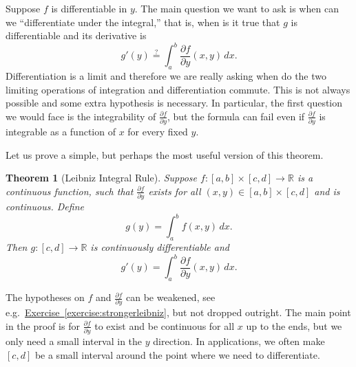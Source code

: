 \documentclass[12pt,openany]{book}
\newcommand{\R}{{\mathbb{R}}}
\newcommand{\myindex}[1]{#1\index{#1}}
\theoremstyle{plain}
\newtheorem{thm}{Theorem}[section]
\theoremstyle{remark}
\theoremstyle{definition}
\theoremstyle{exercise}
\theoremstyle{example}
\newcommand{\exerciseref}[1]{\hyperref[#1]{Exercise~\ref*{#1}}}
\begin{document}
Suppose $f$ is differentiable in $y$.  The main question we want to
ask is when can we ``differentiate under the integral,'' that is,
when is it true that $g$ is differentiable and its derivative is
\begin{equation*}
g'(y) \overset{?}{=} \int_a^b \frac{\partial f}{\partial y}(x,y) \,dx .
\end{equation*}
Differentiation is a limit and therefore we are really asking when do the
two limiting operations of integration and differentiation commute.
This is not always possible and some extra hypothesis is
necessary.  In particular, the first
question we would face is the integrability of
$\frac{\partial f}{\partial y}$, but the formula can fail even if
$\frac{\partial f}{\partial y}$ is integrable as a function of $x$ for every
fixed $y$.

Let us prove a simple, but perhaps the most useful version of this theorem.

\begin{thm}[\myindex{Leibniz Integral Rule}]
Suppose $f \colon [a,b] \times [c,d] \to \R$ is a continuous function,
such that $\frac{\partial f}{\partial y}$ exists for all $(x,y) \in [a,b]
\times [c,d]$ and is continuous.  Define
\begin{equation*}
g(y) = \int_a^b f(x,y) \,dx .
\end{equation*}
Then $g \colon [c,d] \to \R$ is continuously differentiable and
\begin{equation*}
g'(y) = \int_a^b \frac{\partial f}{\partial y}(x,y) \,dx .
\end{equation*}
\end{thm}

The hypotheses on $f$ and $\frac{\partial f}{\partial y}$ can be
weakened, see e.g.\ \exerciseref{exercise:strongerleibniz},
but not dropped outright.
The main point in the proof is for
$\frac{\partial f}{\partial y}$ to exist and be continuous for all $x$
up to the ends, but we only need a small
interval in the $y$ direction.  In applications, we often make $[c,d]$ be a
small interval around the point where we need to differentiate.
\end{document}
